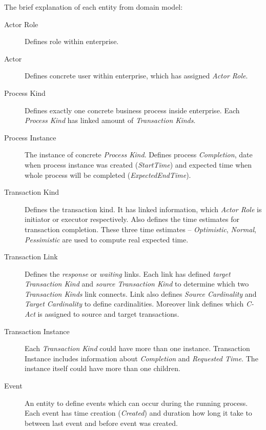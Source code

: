 The brief explanation of each entity from domain model:
\begin{description}
\item[Actor Role] Defines role within enterprise. 
\item[Actor] Defines concrete user within enterprise, which has assigned \textit{Actor Role}.

\item[Process Kind] Defines exactly one concrete business process inside enterprise. Each \textit{Process Kind} has linked amount of \textit{Transaction Kinds}.

\item[Process Instance] The instance of concrete \textit{Process Kind}. Defines process \textit{Completion}, date when process instance was created (\textit{StartTime}) and expected time when whole process will be completed (\textit{ExpectedEndTime}).

\item[Transaction Kind] Defines the transaction kind. It has linked information, which \textit{Actor Role} is initiator or executor respectively. Also defines the time estimates for transaction completion. These three time estimates -- \textit{Optimistic}, \textit{Normal}, \textit{Pessimistic} are used to compute real expected time. 

\item[Transaction Link] Defines the \textit{response} or \textit{waiting} links. Each link has defined \textit{target Transaction Kind}  and \textit{source Transaction Kind} to determine which two \textit{Transaction Kinds} link connects. Link also defines \textit{Source Cardinality} and \textit{Target Cardinality} to define cardinalities. Moreover link defines which \textit{C-Act} is assigned to source and target transactions.  

\item[Transaction Instance] Each \textit{Transaction Kind} could have more than one instance. Transaction Instance includes information about \textit{Completion} and \textit{Requested Time}. The instance itself could have more than one children. 

\item[Event] An entity to define events which can occur during the running process. Each event has time creation (\textit{Created}) and duration how long it take to between last event and before event was created.

\end{description}

